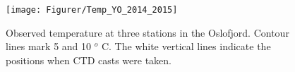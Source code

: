 \begin{figure}[htb]
	\centerline{
		\texttt{[image: Figurer/Temp\_YO\_2014\_2015]} }
\caption{\small Observed temperature at three stations in the Oslofjord. Contour lines mark 5 and 10 $^o$ C. The white vertical lines indicate the positions when CTD casts were taken. }
	\label{fig:Temp_YO_2014_2015}
\end{figure}

